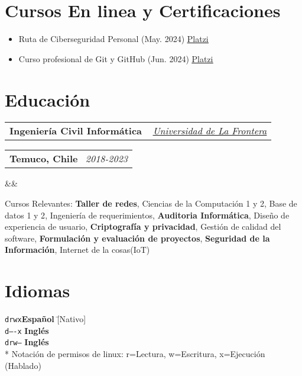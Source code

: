 \documentclass[11pt,a4paper,sans]{moderncv}
\makeatletter
\newcommand{\sectionMargin}{-3mm}
\newcommand*{\customcventry}[7][.13em]{
    \begin{tabular}{@{}l}
    {\bfseries #4} \
    {\itshape #3}
    \end{tabular}
    \hfill
    \begin{tabular}{l@{}}
    {\bfseries #5} \
    {\itshape #2}
    \end{tabular}
    \ifx&#7&%
    \else{\
    \begin{minipage}{\maincolumnwidth}%
    \small#7%
    \end{minipage}}\fi%
    \par\addvspace{#1}
}
\makeatother
\begin{document}
\vspace*{\sectionMargin}

\section{Cursos En linea y Certificaciones}{
\begin{itemize}[label=\textbullet, noitemsep]
    \item Ruta de Ciberseguridad Personal (May. 2024) \href{https://1drv.ms/b/c/13c8ae619d64655e/EZYaMe6SBhJAshtvq4ORCQoBwWMYRerI4_xiuqXjORVd0w?e=I4tLqg}{\underline{Platzi}}
    \item Curso profesional de Git y GitHub (Jun. 2024) \href{https://1drv.ms/b/c/13c8ae619d64655e/EXeQGPrTCjFDpmx8pCItVTwB-OS1r-tkKJbmgYnahuxtYg?e=mc9YcH}{\underline{Platzi}}
\end{itemize}
}

\vspace*{-6mm}

\section{Educación}{
\customcventry
    {2018-2023}
    { \href{https://1drv.ms/b/c/13c8ae619d64655e/EV5lZJ1hrsgggBOHLAAAAAABHh9OZUbWLd2nx7PTa_OSsg?e=Fedmge}{\underline{Universidad de La Frontera}} }
    {Ingeniería Civil Informática}
    {Temuco, Chile}
    {}{}
    {Cursos Relevantes: 
      \textbf{Taller de redes}, 
        {Ciencias de la Computación} 1 y 2, 
        {Base de datos 1 y 2}, 
        {Ingeniería de requerimientos},
        \textbf{Auditoria Informática}, 
        {Diseño de experiencia de usuario}, 
        \textbf{Criptografía y privacidad}, 
        Gestión de {calidad del software}, 
        \textbf{Formulación y evaluación de proyectos},
        \textbf{Seguridad de la Información},
        Internet de la cosas{(IoT)}
}
}

\vspace*{\sectionMargin}

\section{Idiomas}{
\begin{tabbing}
    \texttt{drwx}\hspace{1mm}\= \textbf{Español}    \hspace{1mm}\=  [Nativo] \\
    \texttt{d----x} \>          \textbf{Inglés}     \>              [B1] \\
    \texttt{drw--}  \>          \textbf{Inglés}     \>              [Técnico] \\
    \** Notación de permisos de linux: r=Lectura, w=Escritura, x=Ejecución (Hablado)
\end{tabbing}
}
\end{document}
